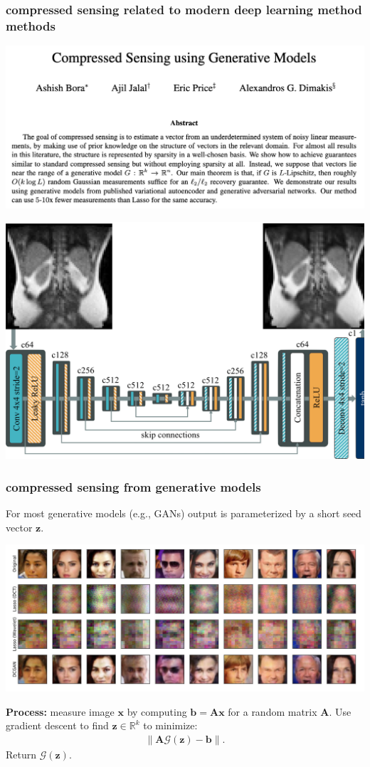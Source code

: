 \documentclass[compress]{beamer}
\newcommand{\bv}[1]{\mathbf{#1}}
\newcommand{\R}{\mathbb{R}}
\begin{document}
\begin{frame}
	\frametitle{compressed sensing related to modern deep learning method methods}
	\begin{center}
		\includegraphics[width=.7\textwidth]{price1.png}
		
		\vspace{.5em}
		\includegraphics[width=.5\textwidth]{medical_autoencode.png}
	\end{center}
\end{frame}

\begin{frame}
	\frametitle{compressed sensing from generative models}
	For most generative models (e.g., GANs) output is parameterized by a short seed vector $\bv{z}$. 
	\vspace{-.5em}
	\begin{center}
		\includegraphics[width=\textwidth]{price2.png}
	\end{center}
	\vspace{-1em}

\textbf{Process:} measure image $\bv{x}$ by computing $\bv{b} = \bv{A}\bv{x}$ for a random matrix $\bv{A}$. Use gradient descent to find $\bv{z}\in \R^k$ to minimize:
\begin{align*}
	\|\bv{A}\mathcal{G}(\bv{z}) - \bv{b}\|.
\end{align*}
Return $\mathcal{G}(\bv{z})$. 
\end{frame}
\end{document}
